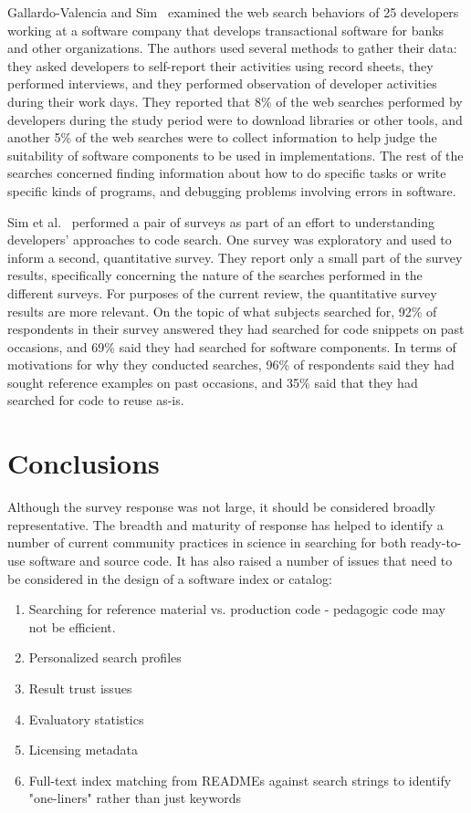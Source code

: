 \documentclass{casicswhitepaper}
\begin{document}
Gallardo-Valencia and Sim~\cite{gallardo2011kinds} examined the web search behaviors of 25 developers working at a software company that develops transactional software for banks and other organizations.  The authors used several methods to gather their data: they asked developers to self-report their activities using record sheets, they performed interviews, and they performed observation of developer activities during their work days.  They reported that 8\% of the web searches performed by developers during the study period were to download libraries or other tools, and another 5\% of the web searches were to collect information to help judge the suitability of software components to be used in implementations.  The rest of the searches concerned finding information about how to do specific tasks or write specific kinds of programs, and debugging problems involving errors in software.

Sim et al.~\cite{sim2012software} performed a pair of surveys as part of an effort to understanding developers' approaches to code search.  One survey was exploratory and used to inform a second, quantitative survey.  They report only a small part of the survey results, specifically concerning the nature of the searches performed in the different surveys.  For purposes of the current review, the quantitative survey results are more relevant.  On the topic of what subjects searched for, 92\% of respondents in their survey answered they had searched for code snippets on past occasions, and 69\% said they had searched for software components.  In terms of motivations for why they conducted searches, 96\% of respondents said they had sought reference examples on past occasions, and 35\% said that they had searched for code to reuse as-is.


\section{Conclusions}

Although the survey response was not large, it should be considered broadly representative. The breadth and maturity of response has helped to identify a number of current community practices in science in searching for both ready-to-use software and source code. It has also raised a number of issues that need to be considered in the design of a software index or catalog:

\begin{enumerate}
\item Searching for reference material vs. production code - pedagogic code may not be efficient.
\item Personalized search profiles
\item Result trust issues
\item Evaluatory statistics 
\item Licensing metadata
\item Full-text index matching from READMEs against search strings to identify "one-liners" rather than just keywords
\end{enumerate}
\end{document}
